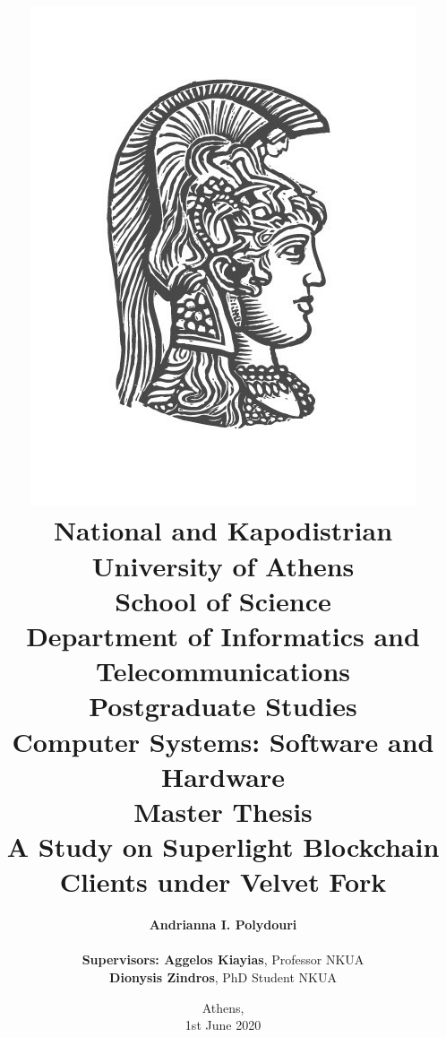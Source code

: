 \title{
    {\includegraphics[scale=0.8]{figures/logo_uoa.jpg}}\\
    {\large National and Kapodistrian University of Athens \\ 
    School of Science \\ 
    Department of Informatics and Telecommunications}\\
    \vspace{1cm}
    Postgraduate Studies \\ 
    Computer Systems: Software and Hardware\\
    \vspace{10mm}
    {Master Thesis}\\
    \vspace{3mm}
    {\textbf{\LARGE A Study on Superlight Blockchain Clients under Velvet Fork}}\\
    \vspace{1cm}
    }

\author{
    \textbf{Andrianna I. Polydouri} \\ 
    \vspace{1cm} \\ 
    \textbf{Supervisors: Aggelos Kiayias}, Professor NKUA\\
    \hspace{3.68cm}
    \textbf{Dionysis Zindros}, PhD Student NKUA
    \vspace{2cm}
}

\date{Athens, \\ 1st June 2020}